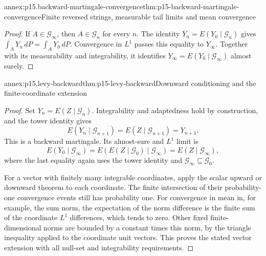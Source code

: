 \begin{annexitem}{annex:p15.backward-martingale-convergence}{thm:p15-backward-martingale-convergence}{Finite reversed strings, measurable tail limits and mean convergence}
\begin{proof}
If \(A\in\mathcal G_\infty\), then \(A\in\mathcal G_n\) for every \(n\).
The identity \(Y_n=E(Y_0\mid\mathcal G_n)\) gives
\(\int_A Y_n\,dP=\int_A Y_0\,dP\).
Convergence in \(L^1\) passes this equality to \(Y_\infty\).
Together with its measurability and integrability, it identifies
\(Y_\infty=E(Y_0\mid\mathcal G_\infty)\) almost surely.
\end{proof}
\end{annexitem}

\begin{annexitem}{annex:p15.levy-backward}{thm:p15-levy-backward}{Downward conditioning and the finite-coordinate extension}
\begin{proof}
Set \(Y_n=E(Z\mid\mathcal G_n)\). Integrability and adaptedness
hold by construction, and the tower identity gives
\[
                   E(Y_n\mid\mathcal G_{n+1})
                         =E(Z\mid\mathcal G_{n+1})=Y_{n+1}.
\]
This is a backward martingale. Its almost-sure and \(L^1\) limit is
\[
 E(Y_0\mid\mathcal G_\infty)
      =E(E(Z\mid\mathcal G_0)\mid\mathcal G_\infty)
      =E(Z\mid\mathcal G_\infty),
\]
where the last equality again uses the tower identity and
\(\mathcal G_\infty\subseteq\mathcal G_0\).

For a vector with finitely many integrable coordinates, apply the scalar
upward or downward theorem to each coordinate. The finite intersection
of their probability-one convergence events still has probability one.
For convergence in mean in, for example, the sum norm, the expectation
of the norm difference is the finite sum of the coordinate \(L^1\)
differences, which tends to zero. Other fixed finite-dimensional norms
are bounded by a constant times this norm, by the triangle inequality
applied to the coordinate unit vectors. This proves the stated vector
extension with all null-set and integrability requirements.
\end{proof}
\end{annexitem}
